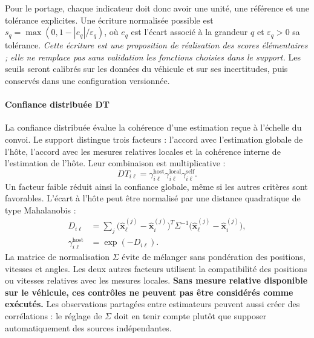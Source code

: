 \documentclass[11pt,a4paper]{article}
\renewcommand{\strong}[1]{\textbf{#1}}
\begin{document}
Pour le portage, chaque indicateur doit donc avoir une unité, une référence et une tolérance explicites. Une écriture normalisée possible est $s_q=\max(0,1-|e_q|/\varepsilon_q)$, où $e_q$ est l'écart associé à la grandeur $q$ et $\varepsilon_q>0$ sa tolérance. \emph{Cette écriture est une proposition de réalisation des scores élémentaires ; elle ne remplace pas sans validation les fonctions choisies dans le support.} Les seuils seront calibrés sur les données du véhicule et sur ses incertitudes, puis conservés dans une configuration versionnée.

\paragraph{Confiance distribuée DT}
La confiance distribuée évalue la cohérence d'une estimation reçue à l'échelle du convoi. Le support distingue trois facteurs : l'accord avec l'estimation globale de l'hôte, l'accord avec les mesures relatives locales et la cohérence interne de l'estimation de l'hôte. Leur combinaison est multiplicative :
\begin{equation}
DT_{i\ell}=\gamma_{i\ell}^{\mathrm{host}}
\gamma_{i\ell}^{\mathrm{local}}
\gamma_{i\ell}^{\mathrm{self}}.
\end{equation}
Un facteur faible réduit ainsi la confiance globale, même si les autres critères sont favorables. L'écart à l'hôte peut être normalisé par une distance quadratique de type Mahalanobis :
\begin{align}
D_{i\ell}&=\sum_j
\bigl(\widehat{\boldsymbol{x}}_\ell^{(j)}-
\widehat{\boldsymbol{x}}_i^{(j)}\bigr)^T\Sigma^{-1}
\bigl(\widehat{\boldsymbol{x}}_\ell^{(j)}-
\widehat{\boldsymbol{x}}_i^{(j)}\bigr),\\
\gamma_{i\ell}^{\mathrm{host}}&=\exp(-D_{i\ell}).
\end{align}
La matrice de normalisation $\Sigma$ évite de mélanger sans pondération des positions, vitesses et angles. Les deux autres facteurs utilisent la compatibilité des positions ou vitesses relatives avec les mesures locales. \strong{Sans mesure relative disponible sur le véhicule, ces contrôles ne peuvent pas être considérés comme exécutés.} Les observations partagées entre estimateurs peuvent aussi créer des corrélations : le réglage de $\Sigma$ doit en tenir compte plutôt que supposer automatiquement des sources indépendantes.
\end{document}
